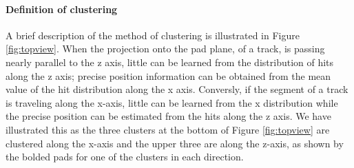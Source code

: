 \documentclass[review]{elsarticle}
\begin{document}
\paragraph{Definition of clustering}
A brief description of the method of clustering is illustrated in Figure \ref{fig:topview}. When the projection onto the pad plane, of a track, is passing nearly parallel to the z axis, little can be learned from the distribution of hits along the z axis; precise position information can be obtained from the mean value of the hit distribution along the x axis. Conversly, if the segment of a track is traveling along the x-axis, little can be learned from the x distribution while the precise position can be estimated from the hits along the z axis. We have illustrated this as the three clusters at the bottom of Figure \ref{fig:topview} are clustered along the x-axis and the upper three are along the z-axis, as shown by the bolded pads for one of the clusters in each direction.
\end{document}
